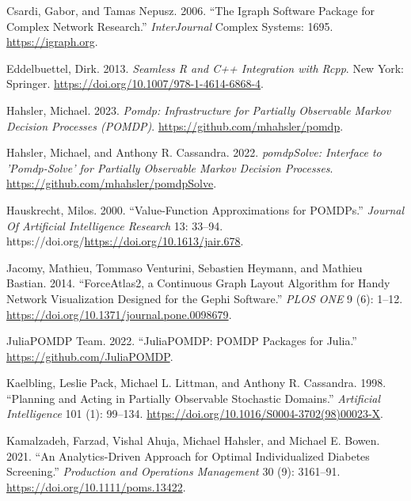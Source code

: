 \begin{CSLReferences}{1}{0}
\leavevmode{}%
Csardi, Gabor, and Tamas Nepusz. 2006. {``The Igraph Software Package for Complex Network Research.''} \emph{InterJournal} Complex Systems: 1695. \url{https://igraph.org}.

\leavevmode{}%
Eddelbuettel, Dirk. 2013. \emph{Seamless {R} and {C++} Integration with {Rcpp}}. New York: Springer. \url{https://doi.org/10.1007/978-1-4614-6868-4}.

\leavevmode{}%
Hahsler, Michael. 2023. \emph{Pomdp: Infrastructure for Partially Observable Markov Decision Processes (POMDP)}. \url{https://github.com/mhahsler/pomdp}.

\leavevmode{}%
Hahsler, Michael, and Anthony R. Cassandra. 2022. \emph{pomdpSolve: Interface to 'Pomdp-Solve' for Partially Observable Markov Decision Processes}. \url{https://github.com/mhahsler/pomdpSolve}.

\leavevmode{}%
Hauskrecht, Milos. 2000. {``Value-Function Approximations for {POMDPs}.''} \emph{Journal Of Artificial Intelligence Research} 13: 33--94. https://doi.org/\url{https://doi.org/10.1613/jair.678}.

\leavevmode{}%
Jacomy, Mathieu, Tommaso Venturini, Sebastien Heymann, and Mathieu Bastian. 2014. {``ForceAtlas2, a Continuous Graph Layout Algorithm for Handy Network Visualization Designed for the {G}ephi Software.''} \emph{PLOS ONE} 9 (6): 1--12. \url{https://doi.org/10.1371/journal.pone.0098679}.

\leavevmode{}%
JuliaPOMDP Team. 2022. {``{JuliaPOMDP:} {POMDP} Packages for {Julia}.''} \url{https://github.com/JuliaPOMDP}.

\leavevmode{}%
Kaelbling, Leslie Pack, Michael L. Littman, and Anthony R. Cassandra. 1998. {``Planning and Acting in Partially Observable Stochastic Domains.''} \emph{Artificial Intelligence} 101 (1): 99--134. \url{https://doi.org/10.1016/S0004-3702(98)00023-X}.

\leavevmode{}%
Kamalzadeh, Farzad, Vishal Ahuja, Michael Hahsler, and Michael E. Bowen. 2021. {``An Analytics-Driven Approach for Optimal Individualized Diabetes Screening.''} \emph{Production and Operations Management} 30 (9): 3161--91. \url{https://doi.org/10.1111/poms.13422}.


\end{CSLReferences}
